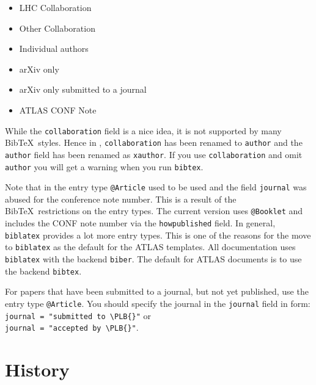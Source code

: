 \documentclass[UKenglish]{latex/atlasdoc}
\newcommand*{\BibTeX}{Bib\TeX}
\newcommand{\Macro}[1]{\texttt{\textbackslash #1}\xspace}
\newcommand{\Package}[1]{\texttt{#1}\xspace}
\begin{document}
\begin{itemize}
\item LHC Collaboration~\cite{lhcCollaboration:2012}
\item Other Collaboration~\cite{otherCollaboration:2007}
\item Individual authors~\cite{authors:2008}
\item arXiv only~\cite{arxivOnly:2009}
\item arXiv only submitted to a journal~\cite{arxivSub:2011}
\item ATLAS CONF Note~\cite{atlasConf:2012}
\end{itemize}

While the \texttt{collaboration} field is a nice idea, it is not supported by many \BibTeX\ styles.
Hence in , \texttt{collaboration} has been renamed to \texttt{author} and
the \texttt{author} field has been renamed as \texttt{xauthor}. If you use \texttt{collaboration} and omit
\texttt{author} you will get a warning when you run \texttt{bibtex}.

Note that in  the entry type \texttt{@Article} used to be used and the field \texttt{journal} 
was abused for the conference note number. This is a result of the \BibTeX\ restrictions on the entry types.
The current version uses \texttt{@Booklet} and includes the CONF note number via the \texttt{howpublished} field.
In general, \texttt{biblatex} provides a lot more entry types.
This is one of the reasons for the  move to \texttt{biblatex} as the default for the ATLAS templates.
All documentation uses \Package{biblatex} with the backend \Package{biber}.
The default for ATLAS documents is to use the backend \Package{bibtex}.

For papers that have been submitted to a journal, but not yet published, use the entry type \texttt{@Article}.
You should specify the journal in the \texttt{journal} field in form:\\
\texttt{journal = "submitted to \Macro{PLB}{}\{\}"} or\\
\texttt{journal = "accepted by \Macro{PLB}{}\{\}"}.


\section*{History}
\end{document}
